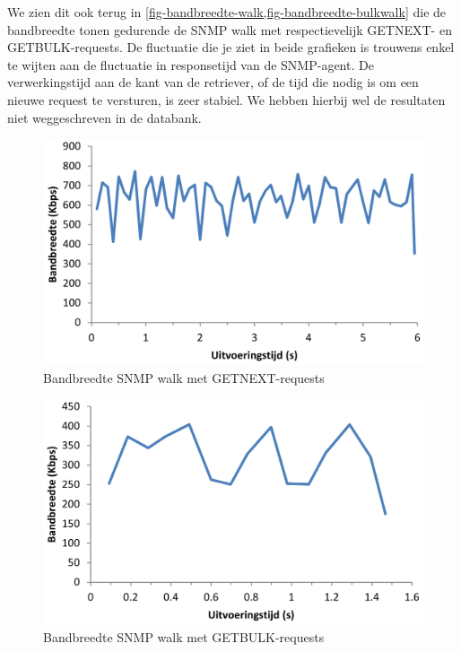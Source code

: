We zien dit ook terug in \cref{fig-bandbreedte-walk,fig-bandbreedte-bulkwalk} die de bandbreedte tonen gedurende
de SNMP walk met respectievelijk GETNEXT- en GETBULK-requests.
De fluctuatie die je ziet in beide grafieken is trouwens enkel te wijten aan de fluctuatie in responsetijd van de SNMP-agent.
De verwerkingstijd aan de kant van de retriever, of de tijd die nodig is om een nieuwe request te versturen, is zeer stabiel.
We hebben hierbij wel de resultaten niet weggeschreven in de databank.

\begin{figure}[h]
	\centering
	\includegraphics[scale=0.40]{figures/bandbreedte/snmpwalk}
	\caption{Bandbreedte SNMP walk met GETNEXT-requests}
	\label{fig-bandbreedte-walk}
\end{figure}

\begin{figure}[h]
	\centering
	\includegraphics[scale=0.40]{figures/bandbreedte/snmpbulkwalk}
	\caption{Bandbreedte SNMP walk met GETBULK-requests}
	\label{fig-bandbreedte-bulkwalk}
\end{figure}

